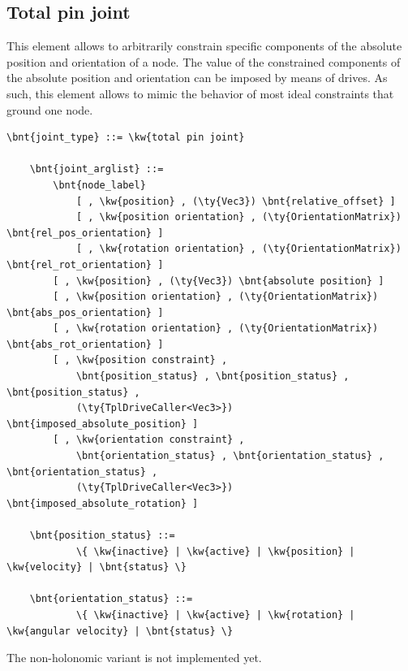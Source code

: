 \subsection{Total pin joint}
This element allows to arbitrarily constrain specific components
of the absolute position and orientation of a node.
The value of the constrained components of the absolute position
and orientation can be imposed by means of drives.
As such, this element allows to mimic the behavior of most
ideal constraints that ground one node.
\label{sec:EL:STRUCT:JOINT:TOTAL_PIN_JOINT}
\begin{Verbatim}[commandchars=\\\{\}]
    \bnt{joint_type} ::= \kw{total pin joint}

    \bnt{joint_arglist} ::=
        \bnt{node_label}
            [ , \kw{position} , (\ty{Vec3}) \bnt{relative_offset} ]
            [ , \kw{position orientation} , (\ty{OrientationMatrix}) \bnt{rel_pos_orientation} ]
            [ , \kw{rotation orientation} , (\ty{OrientationMatrix}) \bnt{rel_rot_orientation} ]
        [ , \kw{position} , (\ty{Vec3}) \bnt{absolute position} ]
        [ , \kw{position orientation} , (\ty{OrientationMatrix}) \bnt{abs_pos_orientation} ]
        [ , \kw{rotation orientation} , (\ty{OrientationMatrix}) \bnt{abs_rot_orientation} ]
        [ , \kw{position constraint} ,
            \bnt{position_status} , \bnt{position_status} , \bnt{position_status} ,
            (\ty{TplDriveCaller<Vec3>}) \bnt{imposed_absolute_position} ]
        [ , \kw{orientation constraint} ,
            \bnt{orientation_status} , \bnt{orientation_status} , \bnt{orientation_status} ,
            (\ty{TplDriveCaller<Vec3>}) \bnt{imposed_absolute_rotation} ]

    \bnt{position_status} ::=
            \{ \kw{inactive} | \kw{active} | \kw{position} | \kw{velocity} | \bnt{status} \}

    \bnt{orientation_status} ::=
            \{ \kw{inactive} | \kw{active} | \kw{rotation} | \kw{angular velocity} | \bnt{status} \}
\end{Verbatim}
The non-holonomic variant is not implemented yet.

